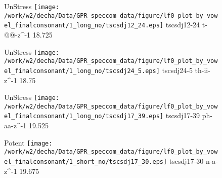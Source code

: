 \documentclass{article}
\begin{document}
\begin{figure}[t]
\begin{minipage}[b]{.24\textwidth}
UnStress
\centering
\texttt{[image: /work/w2/decha/Data/GPR\_speccom\_data/figure/lf0\_plot\_by\_vowel\_finalconsonant/1\_long\_no/tscsdj12\_24.eps]}
tscsdj12-24 t-@@-z\textasciicircum-1 18.725
\end{minipage}
\begin{minipage}[b]{.24\textwidth}
UnStress
\centering
\texttt{[image: /work/w2/decha/Data/GPR\_speccom\_data/figure/lf0\_plot\_by\_vowel\_finalconsonant/1\_long\_no/tscsdj24\_5.eps]}
tscsdj24-5 th-ii-z\textasciicircum-1 18.75
\end{minipage}
\begin{minipage}[b]{.24\textwidth}
UnStress
\centering
\texttt{[image: /work/w2/decha/Data/GPR\_speccom\_data/figure/lf0\_plot\_by\_vowel\_finalconsonant/1\_long\_no/tscsdj17\_39.eps]}
tscsdj17-39 ph-aa-z\textasciicircum-1 19.525
\end{minipage}
\begin{minipage}[b]{.24\textwidth}
\colorbox{Apricot}{Potent}
\centering
\texttt{[image: /work/w2/decha/Data/GPR\_speccom\_data/figure/lf0\_plot\_by\_vowel\_finalconsonant/1\_short\_no/tscsdj17\_30.eps]}
tscsdj17-30 n-a-z\textasciicircum-1 19.675
\end{minipage}
\end{figure}
\end{document}
